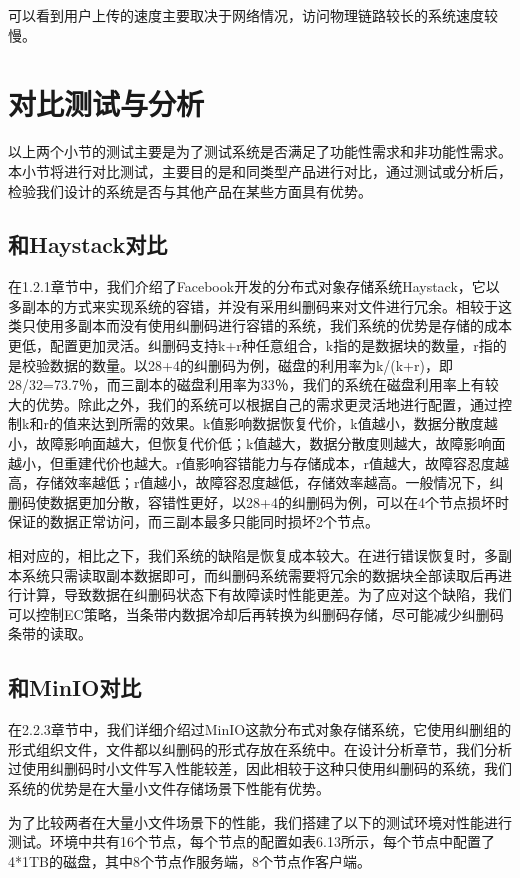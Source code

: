 可以看到用户上传的速度主要取决于网络情况，访问物理链路较长的系统速度较慢。

\section{对比测试与分析}%
以上两个小节的测试主要是为了测试系统是否满足了功能性需求和非功能性需求。本小节将进行对比测试，主要目的是和同类型产品进行对比，通过测试或分析后，检验我们设计的系统是否与其他产品在某些方面具有优势。

\subsection{和Haystack对比}%
在1.2.1章节中，我们介绍了Facebook开发的分布式对象存储系统Haystack，它以多副本的方式来实现系统的容错，并没有采用纠删码来对文件进行冗余。相较于这类只使用多副本而没有使用纠删码进行容错的系统，我们系统的优势是存储的成本更低，配置更加灵活。纠删码支持k+r种任意组合，k指的是数据块的数量，r指的是校验数据的数量。以28+4的纠删码为例，磁盘的利用率为k/(k+r)，即28/32=73.7％，而三副本的磁盘利用率为33％，我们的系统在磁盘利用率上有较大的优势。除此之外，我们的系统可以根据自己的需求更灵活地进行配置，通过控制k和r的值来达到所需的效果。k值影响数据恢复代价，k值越小，数据分散度越小，故障影响面越大，但恢复代价低；k值越大，数据分散度则越大，故障影响面越小，但重建代价也越大。r值影响容错能力与存储成本，r值越大，故障容忍度越高，存储效率越低；r值越小，故障容忍度越低，存储效率越高。一般情况下，纠删码使数据更加分散，容错性更好，以28+4的纠删码为例，可以在4个节点损坏时保证的数据正常访问，而三副本最多只能同时损坏2个节点。

相对应的，相比之下，我们系统的缺陷是恢复成本较大。在进行错误恢复时，多副本系统只需读取副本数据即可，而纠删码系统需要将冗余的数据块全部读取后再进行计算，导致数据在纠删码状态下有故障读时性能更差。为了应对这个缺陷，我们可以控制EC策略，当条带内数据冷却后再转换为纠删码存储，尽可能减少纠删码条带的读取。

\subsection{和MinIO对比}%
在2.2.3章节中，我们详细介绍过MinIO这款分布式对象存储系统，它使用纠删组的形式组织文件，文件都以纠删码的形式存放在系统中。在设计分析章节，我们分析过使用纠删码时小文件写入性能较差，因此相较于这种只使用纠删码的系统，我们系统的优势是在大量小文件存储场景下性能有优势。

为了比较两者在大量小文件场景下的性能，我们搭建了以下的测试环境对性能进行测试。环境中共有16个节点，每个节点的配置如表6.13所示，每个节点中配置了4*1TB的磁盘，其中8个节点作服务端，8个节点作客户端。

